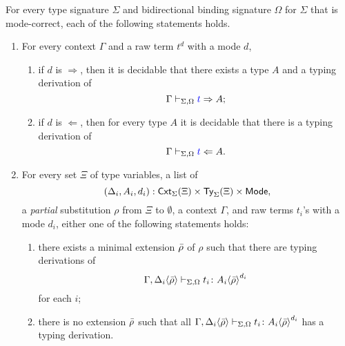 \documentclass[acmsmall,screen]{acmart}
\theoremstyle{acmdefinition}
\begin{document}
\begin{theorem}
  For every type signature $\Sigma$ and bidirectional binding signature $\Omega$ for $\Sigma$ that is mode-correct, each of the following statements holds.
  \begin{enumerate}
    \item For every context $\Gamma$ and a raw term $t^d$ with a mode $d$, 
      \begin{enumerate}
        \item if $d$ is $\Rightarrow$, then it is decidable that there exists a type $A$ and a typing derivation of
          \[\Gamma \vdash_{\Sigma, \Omega} {\textcolor{blue}{t}} \Rightarrow A;
          \]
        \item if $d$ is $\Leftarrow$, then for every type $A$ it is decidable that there is a typing derivation of
          \[
            \Gamma \vdash_{\Sigma, \Omega} {\textcolor{blue}{t}} \Leftarrow A.
          \]
      \end{enumerate}

    \item For every set $\Xi$ of type variables, a list of
      \[
        \left(\Delta_i, A_i, d_i\right) : \mathsf{Cxt}_{\Sigma}(\Xi) \times \mathsf{Ty}_{\Sigma}(\Xi) \times \mathsf{Mode}, 
      \]
      a \emph{partial} substitution $\rho$ from $\Xi$ to $\emptyset$, a context $\Gamma$, and raw terms $t_i$'s with a mode $d_i$, either one of the following statements holds:
      \begin{enumerate}
        \item there exists a minimal extension $\bar{\rho}$ of $\rho$ such that there are typing derivations of
          \[
            \Gamma, {\Delta_i}\!\left<{\bar{\rho}}\right> \vdash_{\Sigma, \Omega} t_i \colon {A_i}\!\left<{\bar{\rho}}\right>^{d_i}
          \]
          for each $i$;

        \item there is no extension $\bar{\rho}$ such that all $\Gamma, {\Delta_i}\!\left<{\bar{\rho}}\right> \vdash_{\Sigma, \Omega} t_i \colon {A_i}\!\left<{\bar{\rho}}\right>^{d_i}$ has a typing derivation. 
      \end{enumerate}
  \end{enumerate}
\end{theorem}
\end{document}
